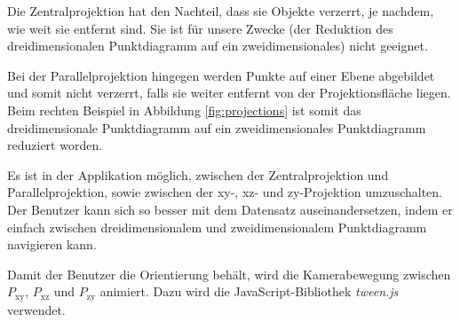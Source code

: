 Die Zentralprojektion hat den Nachteil, dass sie Objekte verzerrt, je nachdem, wie weit sie entfernt sind. Sie ist für unsere Zwecke (der Reduktion des dreidimensionalen Punktdiagramm auf ein zweidimensionales) nicht geeignet.

Bei der Parallelprojektion hingegen werden Punkte auf einer Ebene abgebildet und somit nicht verzerrt, falls sie weiter entfernt von der Projektionsfläche liegen. Beim rechten Beispiel in Abbildung \ref{fig:projections} ist somit das dreidimensionale Punktdiagramm auf ein zweidimensionales Punktdiagramm reduziert worden.

Es ist in der Applikation möglich, zwischen der Zentralprojektion und Parallelprojektion, sowie zwischen der xy-, xz- und zy-Projektion umzuschalten. Der Benutzer kann sich so besser mit dem Datensatz auseinandersetzen, indem er einfach zwischen dreidimensionalem und zweidimensionalem Punktdiagramm navigieren kann.

Damit der Benutzer die Orientierung behält, wird die Kamerabewegung zwischen $P_{\text{xy}}$, $P_{\text{xz}}$ und $P_{\text{zy}}$ animiert. Dazu wird die JavaScript-Bibliothek \textit{tween.js} \cite{tween} verwendet.
